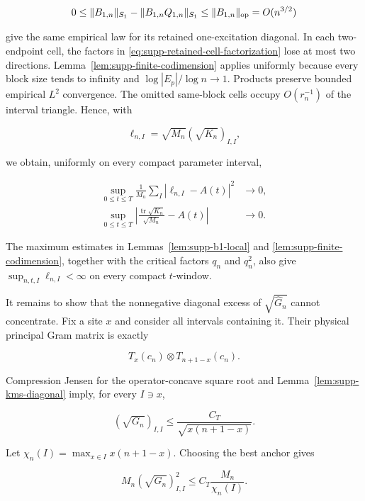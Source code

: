\[
 0\le\|B_{1,n}\|_{S_1}-\|B_{1,n}Q_{1,n}\|_{S_1}
 \le\|B_{1,n}\|_{\rm op}=O(n^{3/2})
\]

give the same empirical law for its retained one-excitation diagonal.  In
each two-endpoint cell, the factors in
\eqref{eq:supp-retained-cell-factorization} lose at most two directions.
Lemma~\ref{lem:supp-finite-codimension} applies uniformly because every
block size tends to infinity and
\(\log|E_p|/\log n\to1\).  Products preserve bounded empirical
\(L^2\) convergence.  The omitted same-block cells occupy
\(O(r_n^{-1})\) of the interval triangle.  Hence, with

\[
 \ell_{n,I}=\sqrt{M_n}(\sqrt{K_n})_{I,I},
\]

we obtain, uniformly on every compact parameter interval,

\begin{align}
 \sup_{0\le t\le T}\frac1{M_n}\sum_I
 |\ell_{n,I}-A(t)|^2&\longrightarrow0,
 \label{eq:supp-retained-local}\\
 \sup_{0\le t\le T}\left|
 \frac{\operatorname{tr}\sqrt{K_n}}{\sqrt{M_n}}-A(t)
 \right|&\longrightarrow0.
 \label{eq:supp-retained-trace}
\end{align}

The maximum estimates in Lemmas~\ref{lem:supp-b1-local} and
\ref{lem:supp-finite-codimension}, together with the critical factors
\(q_n\) and \(q_n^2\), also give
\(\sup_{n,t,I}\ell_{n,I}<\infty\) on every compact \(t\)-window.

It remains to show that the nonnegative diagonal excess of
\(\sqrt{\widehat G_n}\) cannot concentrate.  Fix a site \(x\) and consider
all intervals containing it.  Their physical principal Gram matrix is exactly

\begin{equation}\label{eq:supp-anchor-kms-product}
 T_x(c_n)\otimes T_{n+1-x}(c_n).
\end{equation}

Compression Jensen for the operator-concave square root and
Lemma~\ref{lem:supp-kms-diagonal} imply, for every \(I\ni x\),

\begin{equation}\label{eq:supp-anchor-diagonal-bound}
 (\sqrt{G_n})_{I,I}
 \le\frac{C_T}{\sqrt{x(n+1-x)}}.
\end{equation}

Let \(\chi_n(I)=\max_{x\in I}x(n+1-x)\).  Choosing the best anchor gives

\begin{equation}\label{eq:supp-ui-majorant}
 M_n(\sqrt{G_n})_{I,I}^2
 \le C_T\frac{M_n}{\chi_n(I)}.
\end{equation}

